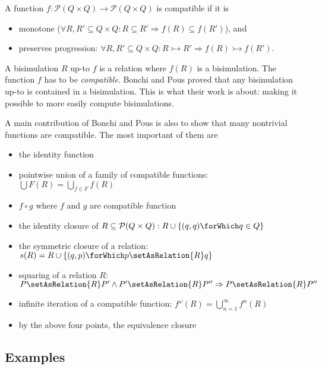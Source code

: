 \begin{definition}
  A function $f : \mathcal{P}(Q \times Q) \to \mathcal{P}(Q \times Q)$ is compatible if it is
  \begin{itemize}
    \item monotone ($\forall R, R' \subseteq Q \times Q: R \subseteq R' \Rightarrow f(R) \subseteq f(R')$), and
    \item preserves progression:
        $\forall R, R' \subseteq Q \times Q: R \rightarrowtail R' \Rightarrow f(R) \rightarrowtail f(R')$.
  \end{itemize}
\end{definition}

A bisimulation $R$ up-to $f$ is a relation where $f(R)$ is a bisimulation.
The function $f$ has to be \textit{compatible}. Bonchi and Pous proved that
any bisimulation up-to is contained in a bisimulation. This is what their
work is about: making it possible to more easily compute bisimulations.

A main contribution of Bonchi and Pous is also to show that many nontrivial functions
are compatible. The most important of them are

\begin{itemize}
  \item the identity function
  \item pointwise union of a family of compatible functions: \\
          $\bigcup F(R) = \bigcup_{f \in F} f(R)$
  \item $f \circ g$ where $f$ and $g$ are compatible function
  \item the identity closure of $R \subseteq \mathcal{P}(Q \times Q): R \cup \{(q, q)\forWhich q \in Q\}$
  \item the symmetric closure of a relation: $s(R) = R \cup \{(q, p) \forWhich p \setAsRelation{R} q\}$
  \item squaring of a relation $R$: $P \setAsRelation{R} P' \land P' \setAsRelation{R} P'' \Rightarrow P \setAsRelation{R} P''$
  \item infinite iteration of a compatible function: $f^\omega(R) = \bigcup_{n = 1}^{\infty} f^n(R)$
  \item by the above four points, the equivalence closure
\end{itemize}

\subsection{Examples}

